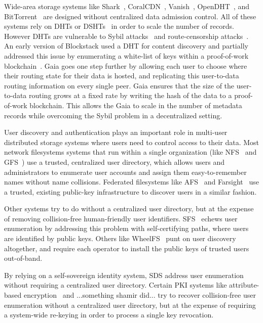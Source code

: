 Wide-area storage systems like Shark~\cite{shark}, CoralCDN~\cite{coral}, Vanish~\cite{vanish},
OpenDHT~\cite{opendht}, and BitTorrent~\cite{bittorrent} are designed without centralized data admission
control.  All of these systems rely on DHTs or DSHTs~\cite{dsht} in order to
scale the number of records.  However DHTs are vulnerable to Sybil
attacks~\cite{sybil-attack} and route-censorship
attacks~\cite{dht-route-censorship}.  An early version of Blockstack used a DHT
for content discovery and partially addressed this issue by enumerating a
white-list of keys within a proof-of-work blockchain~\cite{muneebali-thesis}.
Gaia goes one step further by allowing each user to choose where their routing
state for their data is hosted, and replicating this user-to-data routing
information on every single peer.  Gaia ensures that the size of the 
user-to-data routing grows at a fixed rate by writing the hash of the data to a
proof-of-work blockchain.  This allows the Gaia to scale in the number of
metadata records while overcoming the Sybil problem in a decentralized setting.

User discovery and authentication plays an important role in multi-user
distributed storage systems where users need to control access to their data.
Most network filesystems systems that run within a single organization (like
NFS~\cite{nfs} and GFS~\cite{gfs}) use a trusted, centralized user directory,
which allows users and administrators to enumerate user accounts and assign them
easy-to-remember names without name collisions.
Federated filesystems like AFS~\cite{afs} and Farsight~\cite{farsight} use a
trusted, existing public-key infrastructure to discover users in a similar
fashion.

Other systems try to do without a centralized user directory, but at the expense
of removing collision-free human-friendly user identifiers.
SFS~\cite{sfs} echews user enumeration by addressing this problem with
self-certifying paths, where users are identified by public keys.
Others like WheelFS~\cite{wheelfs} punt on user discovery altogether, and
require each operator to install the public keys of trusted users out-of-band.

By relying on a self-sovereign identity system, SDS address user
enumeration without requiring a centralized user directory.  Certain PKI systems
like attribute-based encryption~\cite{abe} and {...something shamir did...} try to recover
collision-free user enumeration without a centralized user directory, but at the
expense of requiring a system-wide re-keying in order to process a single key
revocation.

